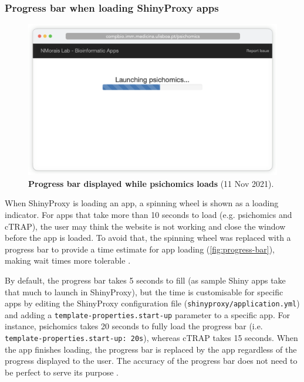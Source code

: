 \subsubsection{Progress bar when loading ShinyProxy apps}

\begin{figure}
  \vspace{-\intextsep}
  \includegraphics[width=\linewidth]{images/app-server/progress-bar}
  \caption[Screenshot of app loading]{\textbf{Progress bar displayed while psichomics loads} (11 Nov 2021).}
  \label{fig:progress-bar}
  \vspace{-\intextsep}
\end{figure}


When ShinyProxy is loading an app, a spinning wheel is shown as a loading indicator. For apps that take more than 10 seconds to load (e.g. psichomics and cTRAP), the user may think the website is not working and close the window before the app is loaded. To avoid that, the spinning wheel was replaced with a progress bar to provide a time estimate for app loading (\autoref{fig:progress-bar}), making wait times more tolerable \cite{myers:1985aa,yablonski:2020ts}.

\bigskip
\bigskip

By default, the progress bar takes 5 seconds to fill (as sample Shiny apps take that much to launch in ShinyProxy), but the time is customisable for specific apps by editing the ShinyProxy configuration file (\texttt{shinyproxy/application.yml}) and adding a \texttt{template-properties.start-up} parameter to a specific app. For instance, psichomics takes 20 seconds to fully load the progress bar (i.e. \texttt{template-properties.start-up: 20s}), whereas cTRAP takes 15 seconds. When the app finishes loading, the progress bar is replaced by the app regardless of the progress displayed to the user. The accuracy of the progress bar does not need to be perfect to serve its purpose \cite{myers:1985aa,yablonski:2020ts}.

